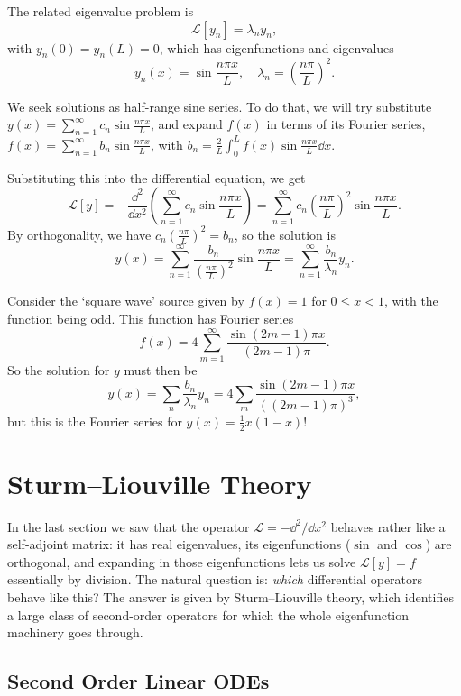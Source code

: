 The related eigenvalue problem is
$$
\mathcal{L}[y_n] = \lambda_n y_n,
$$
with $y_n(0) = y_n(L) = 0$, which has eigenfunctions and eigenvalues
$$
y_n(x) = \sin \frac{n \pi x}{L}, \quad \lambda_n = \left(\frac{n \pi }{L}\right)^2.
$$

We seek solutions as half-range sine series. To do that, we will try substitute $y(x) = \sum_{n = 1}^{\infty} c_n \sin \frac{n \pi x}{L}$, and expand $f(x)$ in terms of its Fourier series, $f(x) = \sum_{n = 1}^{\infty} b_n \sin \frac{n \pi x}{L}$, with $b_n = \frac{2}{L} \int_0^L f(x) \sin \frac{n \pi x}{L} \dd x$.

Substituting this into the differential equation, we get
$$
\mathcal{L}[y] = - \frac{\dd^2}{\dd x^2} \left(\sum_{n = 1}^{\infty} c_n \sin \frac{n \pi x}{L}\right) = \sum_{n = 1}^{\infty} c_n \left(\frac{n \pi}{L}\right)^2 \sin \frac{n \pi x}{L}.
$$
By orthogonality, we have $c_n \left(\frac{n \pi }{L}\right)^2 = b_n$, so the solution is
$$
y(x) = \sum_{n = 1}^{\infty} \frac{b_n}{\left(\frac{n \pi }{L}\right)^2}\sin \frac{n \pi x}{L} = \sum_{n = 1}^{\infty} \frac{b_n}{\lambda_n} y_n.
$$

\begin{example}
    Consider the `square wave' source given by $f(x) = 1$ for $0 \leq x < 1$, with the function being odd. This function has Fourier series
    $$
    f(x)=4 \sum_{m=1}^{\infty} \frac{\sin (2 m-1) \pi x}{(2 m-1) \pi}.
    $$
    So the solution for $y$ must then be
    $$
    y(x)=\sum_{n} \frac{b_{n}}{\lambda_{n}} y_{n}=4 \sum_{m} \frac{\sin (2 m-1) \pi x}{((2 m-1) \pi)^{3}},
    $$
    but this is the Fourier series for $y(x) = \frac{1}{2}x(1 - x)$!
\end{example}

\section{Sturm--Liouville Theory}

In the last section we saw that the operator $\mathcal{L} = -\dd^2/\dd x^2$ behaves rather like a self-adjoint matrix: it has real eigenvalues, its eigenfunctions ($\sin$ and $\cos$) are orthogonal, and expanding in those eigenfunctions lets us solve $\mathcal{L}[y] = f$ essentially by division.
The natural question is: \emph{which} differential operators behave like this? The answer is given by Sturm--Liouville theory, which identifies a large class of second-order operators for which the whole eigenfunction machinery goes through.

\subsection{Second Order Linear ODEs}

